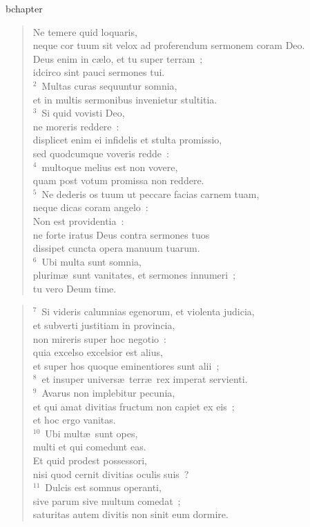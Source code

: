 bchapter\begin{verse}\vspace{-19pt}Ne temere quid loquaris,\\ neque cor tuum sit velox ad proferendum sermonem coram Deo.\\ Deus enim in c\ae lo, et tu super terram~;\\ idcirco sint pauci sermones tui.\\
${}^{2}$~Multas curas sequuntur somnia,\\ et in multis sermonibus invenietur stultitia.\\
${}^{3}$~Si quid vovisti Deo,\\ ne moreris reddere~:\\ displicet enim ei infidelis et stulta promissio,\\ sed quodcumque voveris redde~:\\
${}^{4}$~multoque melius est non vovere,\\ quam post votum promissa non reddere.\\
${}^{5}$~Ne dederis os tuum ut peccare facias carnem tuam,\\ neque dicas coram angelo~:\\ Non est providentia~:\\ ne forte iratus Deus contra sermones tuos\\ dissipet cuncta opera manuum tuarum.\\
${}^{6}$~Ubi multa sunt somnia,\\ plurim\ae\ sunt vanitates, et sermones innumeri~;\\ tu vero Deum time.\end{verse}


\begin{verse}${}^{7}$~Si videris calumnias egenorum, et violenta judicia,\\ et subverti justitiam in provincia,\\ non mireris super hoc negotio~:\\ quia excelso excelsior est alius,\\ et super hos quoque eminentiores sunt alii~;\\
${}^{8}$~et insuper univers\ae\ terr\ae\ rex imperat servienti.\\
${}^{9}$~Avarus non implebitur pecunia,\\ et qui amat divitias fructum non capiet ex eis~;\\ et hoc ergo vanitas.\\
${}^{10}$~Ubi mult\ae\ sunt opes,\\ multi et qui comedunt eas.\\ Et quid prodest possessori,\\ nisi quod cernit divitias oculis suis~?\\
${}^{11}$~Dulcis est somnus operanti,\\ sive parum sive multum comedat~;\\ saturitas autem divitis non sinit eum dormire.\end{verse}



